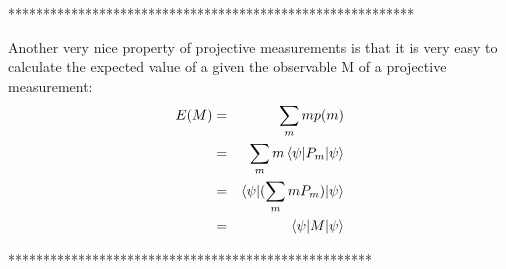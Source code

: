 




**********************************************************


Another very nice property of projective measurements is that it is very easy to calculate the expected value of a given the observable M of a projective measurement:
\begin{eqnarray}
E(M)&=&\sum_m mp(m)\\
&=&\sum_m m \braket{\psi|P_m|\psi}\\
&=&\braket{\psi|(\sum_m mP_m)|\psi}\\
&=&\braket{\psi|M|\psi}
\end{eqnarray}

****************************************************